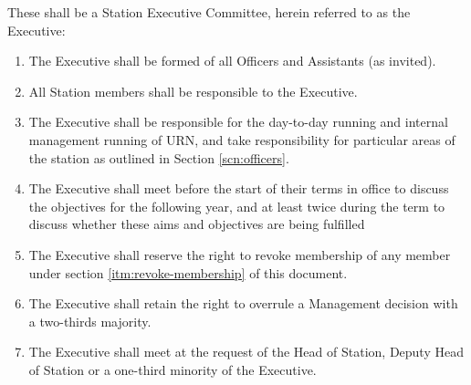 \item These shall be a Station Executive Committee, herein referred to as the Executive:
\begin{enumerate}[label*=\arabic*.]
    \item The Executive shall be formed of all Officers and Assistants (as invited).
    \item All Station members shall be responsible to the Executive.
    \item The Executive shall be responsible for the day-to-day running and internal management running of URN, and take responsibility for particular areas of the station as outlined in Section \ref{scn:officers}.
    \item The Executive shall meet before the start of their terms in office to discuss the objectives for the following year, and at least twice during the term to discuss whether these aims and objectives are being fulfilled
    \item The Executive shall reserve the right to revoke membership of any member under section \ref{itm:revoke-membership} of this document.
    \item The Executive shall retain the right to overrule a Management decision with a two-thirds majority.
    \item The Executive shall meet at the request of the Head of Station, Deputy Head of Station or a one-third minority of the Executive.
\end{enumerate}
